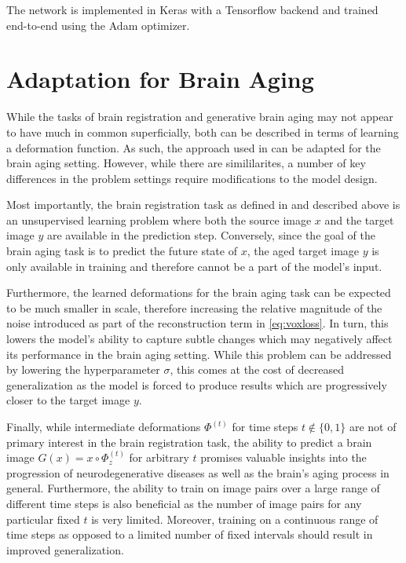 The network is implemented in Keras with a Tensorflow backend and trained end-to-end using the Adam \cite{kingma2014adam} optimizer.

\section{Adaptation for Brain Aging}
\label{sec:ada}
While the tasks of brain registration and generative brain aging may not appear to have much in common superficially, both can be described in terms of learning a deformation function. As such, the approach used in \cite{balakrishnan2019voxelmorph} can be adapted for the brain aging setting. However, while there are simililarites, a number of key differences in the problem settings require modifications to the model design.

Most importantly, the brain registration task as defined in \cite{balakrishnan2019voxelmorph} and described above is an unsupervised learning problem where both the source image $x$ and the target image $y$ are available in the prediction step. Conversely, since the goal of the brain aging task is to predict the future state of $x$, the aged target image $y$ is only available in training and therefore cannot be a part of the model's input.

Furthermore, the learned deformations for the brain aging task can be expected to be much smaller in scale, therefore increasing the relative magnitude of the noise introduced as part of the reconstruction term in \autoref{eq:voxloss}. In turn, this lowers the model's ability to capture subtle changes which may negatively affect its performance in the brain aging setting. While this problem can be addressed by lowering the hyperparameter $\sigma$, this comes at the cost of decreased generalization as the model is forced to produce results which are progressively closer to the target image $y$.

Finally, while intermediate deformations $\Phi^{(t)}$ for time steps $t \notin \{0, 1\}$ are not of primary interest in the brain registration task, the ability to predict a brain image $G(x) = x \circ \Phi_z^{(t)}$ for arbitrary $t$ promises valuable insights into the progression of neurodegenerative diseases as well as the brain's aging process in general.
Furthermore, the ability to train on image pairs over a large range of different time steps is also beneficial as the number of image pairs for any particular fixed $t$ is very limited. Moreover, training on a continuous range of time steps as opposed to a limited number of fixed intervals should result in improved generalization.

